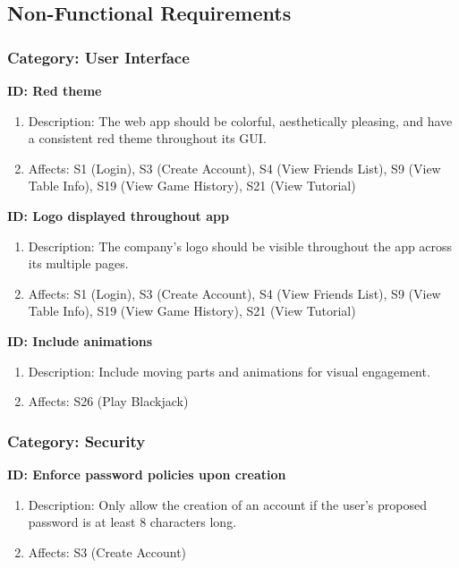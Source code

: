 \subsection{Non-Functional Requirements}

\subsubsection{Category: User Interface}

\textbf{ID: Red theme}
\begin{enumerate}
    \item Description: The web app should be colorful, aesthetically pleasing, and have a consistent red theme throughout its GUI.
    \item Affects: S1 (Login), S3 (Create Account), S4 (View Friends List), S9 (View Table Info), S19 (View Game History), S21 (View Tutorial)
\end{enumerate}

\smallskip

\textbf{ID: Logo displayed throughout app}
\begin{enumerate}
    \item Description: The company's logo should be visible throughout the app across its multiple pages.
    \item Affects: S1 (Login), S3 (Create Account), S4 (View Friends List), S9 (View Table Info), S19 (View Game History), S21 (View Tutorial)
\end{enumerate}

\smallskip

\textbf{ID: Include animations}
\begin{enumerate}
    \item Description: Include moving parts and animations for visual engagement.
    \item Affects: S26 (Play Blackjack)
\end{enumerate}

\subsubsection{Category: Security}

\textbf{ID: Enforce password policies upon creation}
\begin{enumerate}
    \item Description: Only allow the creation of an account if the user's proposed password is at least 8 characters long.
    \item Affects: S3 (Create Account)
\end{enumerate}

